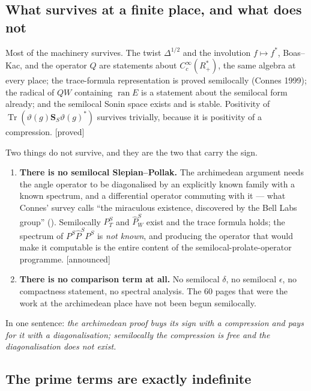 \documentclass[11pt,a4paper]{article}
\theoremstyle{plain}
\theoremstyle{definition}
\theoremstyle{remark}
\newcommand{\st}[1]{{\normalfont\sffamily\footnotesize[#1]}}
\newcommand{\proved}{\st{proved}}
\newcommand{\announced}{\st{announced}}
\newcommand{\R}{\mathbb{R}}
\newcommand{\Z}{\mathbb{Z}}
\newcommand{\Q}{\mathbb{Q}}
\newcommand{\A}{\mathbb{A}}
\newcommand{\E}{\mathcal{E}}
\newcommand{\F}{\mathcal{F}}
\newcommand{\Sonin}{\mathbf{S}}
\newcommand{\QW}{QW}
\newcommand{\file}[1]{\path{#1}}
\def\QW{QW}\def\E{E}\def\F{F}\def\R{R}\def\Q{Q}\def\Z{Z}\def\A{A}%
\begin{document}
\subsection{What survives at a finite place, and what does not}

Most of the machinery survives.  The twist $\Delta^{1/2}$ and the involution
$f\mapsto f^*$, Boas--Kac, and the operator $Q$ are statements about
$C_c^\infty(\R_+^*)$, the same algebra at every place; the trace-formula
representation is proved semilocally (Connes 1999); the radical of $\QW$
containing $\operatorname{ran}\E$ is a statement about the semilocal form
already; and the semilocal Sonin space exists and is stable.  Positivity of
$\operatorname{Tr}(\vartheta(g)\Sonin_S\vartheta(g)^*)$ survives trivially,
because it is positivity of a compression. \proved

Two things do not survive, and they are the two that carry the sign.

\begin{enumerate}\itemsep3pt
\item \textbf{There is no semilocal Slepian--Pollak.}  The archimedean argument
needs the angle operator to be diagonalised by an explicitly known family with a
known spectrum, and a differential operator commuting with it --- what Connes'
survey calls ``the miraculous existence, discovered by the Bell Labs group''
(\file{rhready.tex:1293}).  Semilocally $P^S_T$ and $\widehat P^S_W$ exist and
the trace formula holds; the spectrum of $P^S\widehat P^SP^S$ is \emph{not
known}, and producing the operator that would make it computable is the entire
content of the semilocal-prolate-operator programme. \announced

\item \textbf{There is no comparison term at all.}  No semilocal $\delta$, no
semilocal $\epsilon$, no compactness statement, no spectral analysis.  The 60
pages that were the work at the archimedean place have not been begun
semilocally.
\end{enumerate}

In one sentence: \emph{the archimedean proof buys its sign with a compression and
pays for it with a diagonalisation; semilocally the compression is free and the
diagonalisation does not exist.}

\subsection{The prime terms are exactly indefinite}
\label{sec:indefinite}
\end{document}
